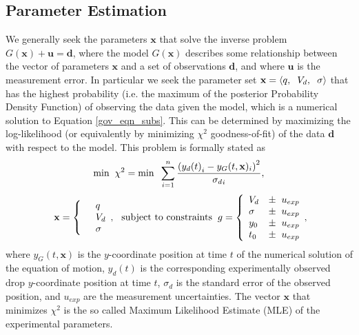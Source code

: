 \documentclass[aip,reprint, floatfix]{revtex4-1}
\begin{document}
\subsection{Parameter Estimation}
We generally seek the parameters $\mathbf{x}$ that solve the inverse problem $G(\mathbf{x}) + \mathbf{u} = \mathbf{d}$, where the model $G(\mathbf{x})$ describes some relationship between the vector of parameters $\mathbf{x}$ and a set of observations $\mathbf{d}$, and where $\mathbf{u}$ is the measurement error. In particular we seek the parameter set $\mathbf{x} = \left\langle q, \hspace{2 mm} V_d, \hspace{2 mm} \sigma \right\rangle$ that has the highest probability (i.e. the maximum of the posterior Probability Density Function) of observing the data given the model, which is a numerical solution to Equation \ref{gov_eqn_subs}. This can be determined by maximizing the log-likelihood (or equivalently by minimizing $\chi^2$ goodness-of-fit) of the data $\mathbf{d}$ with respect to the model. This problem is formally stated as  
\[
\mbox{min} \hspace{2 mm} \chi^2 = \mbox{min} \hspace{2 mm} \sum^n_{i=1} \frac{\left({y_d(t)}_i - y_G(t, \mathbf{x})_i \right)^2}{{\sigma_d}_i},
\]
\begin{eqnarray*} \mbox{} \hspace{2 mm} \begin{split} \mathbf{x} = \left\{ \begin{array}{ll}      & q\\
		  &	V_d\\
          & \sigma 
          \end{array}, \right. 
          \end{split} \hspace{2 mm} \mbox{subject to constraints} \hspace{2 mm} \begin{split}
          g = \left\{ \begin{array}{ll}
           V_d &\pm \hspace{2 mm} u_{exp}\\
      	   \sigma &\pm  \hspace{2 mm} u_{exp}\\
      	   y_0 &\pm \hspace{2 mm} u_{exp}\\
      	   t_0 &\pm \hspace{2 mm} u_{exp}\\
          \end{array}, \right. 
          \end{split}
\end{eqnarray*}
where $y_G(t, \mathbf{x})$ is the $y$-coordinate position at time $t$ of the numerical solution of the equation of motion, $y_d(t)$ is the corresponding experimentally observed drop $y$-coordinate position at time $t$, $\sigma_d$ is the standard error of the observed position, and $u_{exp}$ are the measurement uncertainties. The vector $\mathbf{x}$ that minimizes $\chi^2$ is the so called Maximum Likelihood Estimate (MLE) of the experimental parameters.
\end{document}
